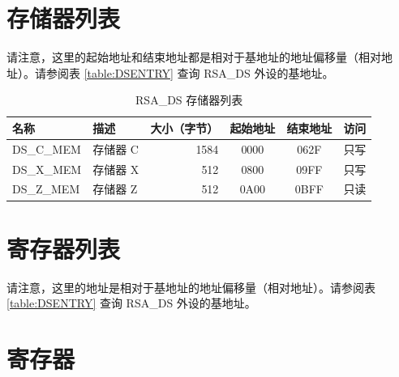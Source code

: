 \documentclass[main\_\_CN.tex]{subfiles}
\begin{document}
\section{ 存储器列表 }

请注意，这里的起始地址和结束地址都是相对于基地址的地址偏移量（相对地址）。请参阅表 \ref{table:DSENTRY} 查询 RSA\_DS 外设的基地址。

\begin{longtable}{ | p{3cm} | p{3cm} | r | c | c | c | }
\caption{RSA\_DS 存储器列表}\label{table:DSMEMORY}
\\\hline
\rowcolor{lightgray}
名称 & 描述 &  大小（字节） & 起始地址 & 结束地址 & 访问 \\ \hline
{DS\_C\_MEM}\label{DSCMEM}  & 存储器 C  & 1584  & \hexprefix{}0000 & \hexprefix{}062F & 只写 \\ \hline
{DS\_X\_MEM}\label{DSXMEM}  & 存储器 X  & 512  & \hexprefix{}0800 & \hexprefix{}09FF & 只写 \\ \hline
{DS\_Z\_MEM}\label{DSZMEM}  & 存储器 Z  & 512  & \hexprefix{}0A00 & \hexprefix{}0BFF & 只读 \\ \hline
\end{longtable}

\hypertarget{digsig-reg-summ}{}
\section{ 寄存器列表 }

请注意，这里的地址是相对于基地址的地址偏移量（相对地址）。请参阅表 \ref{table:DSENTRY} 查询 RSA\_DS 外设的基地址。



\section{ 寄存器 }


\end{document}
